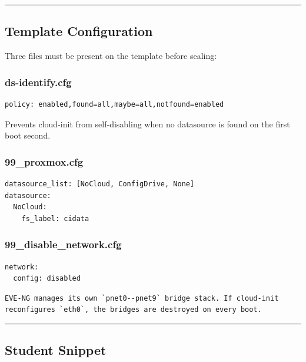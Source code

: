 \begin{center}\rule{0.5\linewidth}{0.5pt}\end{center}

\subsection{Template Configuration}

Three files must be present on the template before sealing:

\subsubsection{ds-identify.cfg}

\begin{lstlisting}
policy: enabled,found=all,maybe=all,notfound=enabled
\end{lstlisting}

Prevents cloud-init from self-disabling when no datasource is found on the first boot second.

\subsubsection{99\_proxmox.cfg}

\begin{lstlisting}
datasource_list: [NoCloud, ConfigDrive, None]
datasource:
  NoCloud:
    fs_label: cidata
\end{lstlisting}

\subsubsection{99\_disable\_network.cfg}

\begin{lstlisting}
network:
  config: disabled
\end{lstlisting}

\begin{lstlisting}
EVE-NG manages its own `pnet0--pnet9` bridge stack. If cloud-init
reconfigures `eth0`, the bridges are destroyed on every boot.
\end{lstlisting}

\begin{center}\rule{0.5\linewidth}{0.5pt}\end{center}

\subsection{Student Snippet}

